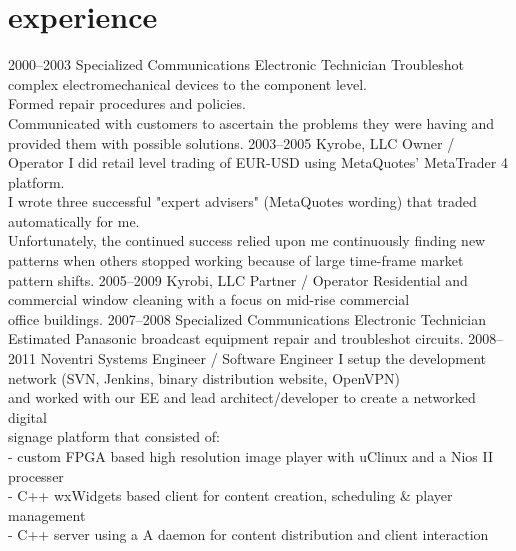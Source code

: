 \section{experience}

\begin{entrylist}
    \entry
        {2000–2003}
        {Specialized Communications}
        {Electronic Technician}
        {Troubleshot complex electromechanical devices to the component level.\\
        Formed repair procedures and policies.\\
        Communicated with customers to ascertain the problems they were having and\\
        provided them with possible solutions.}
    \entry
        {2003–2005}
        {Kyrobe, LLC}
        {Owner / Operator}
        {I did retail level trading of EUR-USD using MetaQuotes' MetaTrader 4 platform.\\
        I wrote three successful "expert advisers" (MetaQuotes wording) that traded\\
        automatically for me.\\
        Unfortunately, the continued success relied upon me continuously finding new\\
        patterns when others stopped working because of large time-frame market pattern shifts.}
    \entry
        {2005–2009}
        {Kyrobi, LLC}
        {Partner / Operator}
        {Residential and commercial window cleaning with a focus on mid-rise commercial\\
        office buildings.}
    \entry
        {2007–2008}
        {Specialized Communications}
        {Electronic Technician}
        {Estimated Panasonic broadcast equipment repair and troubleshot circuits.}
    \entry
        {2008–2011}
        {Noventri}
        {Systems Engineer / Software Engineer}
        {I setup the development network (SVN, Jenkins, binary distribution website, OpenVPN)\\
        and worked with our EE and lead architect/developer to create a networked digital\\
        signage platform that consisted of:\\
        - custom FPGA based high resolution image player with uClinux and a Nios II processer\\
        - C++ wxWidgets based client for content creation, scheduling \& player management\\
        - C++ server using a A daemon for content distribution and client interaction\\
}
\end{entrylist}
